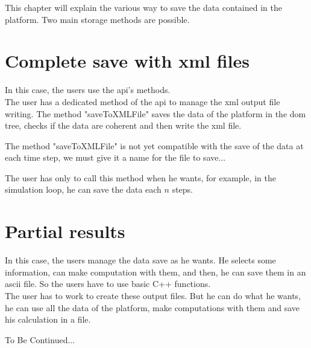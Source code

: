 This chapter will explain the various way to save the data contained in the platform.
Two main storage methods are possible.

\section{Complete save with \ac{xml} files}
In this case, the users use the \acs{api}'s methods.\\
The user has a dedicated method of the \ac{api} to manage the \ac{xml} output file writing. The method "saveToXMLFile" saves the data of the platform in the \ac{dom} tree, checks if the data are coherent and then write the \ac{xml} file.
\begin{ndr}
	The method "saveToXMLFile" is not yet compatible with the save of the data at each time step, we must give it a name for the file to save...
\end{ndr}
The user has only to call this method when he wants, for example, in the simulation loop, he can save the data each $n$ steps.

\section{Partial results}
In this case, the users manage the data save as he wants. He selects some information, can make computation with them, and then, he can save them in an ascii file. So the users have to use basic C++ functions.\\
The user has to work to create these output files. But he can do what he wants, he can use all the data of the platform, make computations with them and save his calculation in a file.
\begin{ndr}
	To Be Continued...
\end{ndr}
